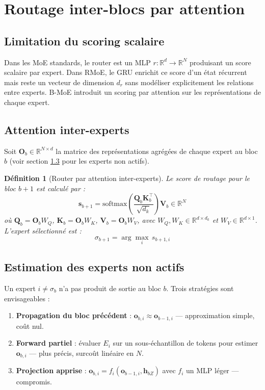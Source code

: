 \documentclass[10pt,a4paper]{article}
\newtheorem{definition}{Définition}
\begin{document}
\section{Routage inter-blocs par attention}

\subsection{Limitation du scoring scalaire}

Dans les MoE standards, le router est un MLP $r : \mathbb{R}^d \to \mathbb{R}^N$ produisant un score scalaire par expert. Dans RMoE, le GRU enrichit ce score d'un état récurrent mais reste un vecteur de dimension $d_r$ sans modéliser explicitement les relations entre experts. B-MoE introduit un scoring par attention sur les représentations de chaque expert.

\subsection{Attention inter-experts}

Soit $\mathbf{O}_b \in \mathbb{R}^{N \times d}$ la matrice des représentations agrégées de chaque expert au bloc $b$ (voir section \ref{sec:estimation} pour les experts non actifs).

\begin{definition}[Router par attention inter-experts]
Le score de routage pour le bloc $b+1$ est calculé par :
\begin{equation}
  \mathbf{s}_{b+1} = \mathrm{softmax}\!\left(\frac{\mathbf{Q}_b \mathbf{K}_b^\top}{\sqrt{d_k}}\right)\mathbf{V}_b \in \mathbb{R}^{N}
\end{equation}
où $\mathbf{Q}_b = \mathbf{O}_b W_Q$, $\mathbf{K}_b = \mathbf{O}_b W_K$, $\mathbf{V}_b = \mathbf{O}_b W_V$, avec $W_Q, W_K \in \mathbb{R}^{d \times d_k}$ et $W_V \in \mathbb{R}^{d \times 1}$. L'expert sélectionné est :
\begin{equation}
  \sigma_{b+1} = \arg\max_{i}\, s_{b+1,i}
\end{equation}
\end{definition}

\subsection{Estimation des experts non actifs}
\label{sec:estimation}

Un expert $i \neq \sigma_b$ n'a pas produit de sortie au bloc $b$. Trois stratégies sont envisageables :
\begin{enumerate}
  \item \textbf{Propagation du bloc précédent} : $\mathbf{o}_{b,i} \approx \mathbf{o}_{b-1,i}$ — approximation simple, coût nul.
  \item \textbf{Forward partiel} : évaluer $E_i$ sur un sous-échantillon de tokens pour estimer $\mathbf{o}_{b,i}$ — plus précis, surcoût linéaire en $N$.
  \item \textbf{Projection apprise} : $\mathbf{o}_{b,i} = f_i(\mathbf{o}_{b-1,i}, \mathbf{h}_{bZ})$ avec $f_i$ un MLP léger — compromis.
\end{enumerate}
\end{document}
